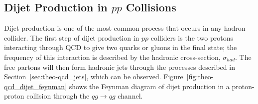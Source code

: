 
\subsection{Dijet Production in $pp$ Collisions}
\label{sec:theo-qcd_dijet}

Dijet production is one of the most common process that occurs in any hadron collider.
The first step of dijet production in $pp$ colliders is the two protons interacting through QCD to give two quarks or gluons in the final state;
the frequency of this interaction is described by the hadronic cross-section, $\sigma_{had}$.
The free partons will then form hadronic jets through the processes described in Section~\ref{sec:theo-qcd_jets}, which can be observed.
Figure~\ref{fig:theo-qcd_dijet_feynman} shows the Feynman diagram of
dijet production in a proton-proton collision through the $qg \to qg$ channel.

